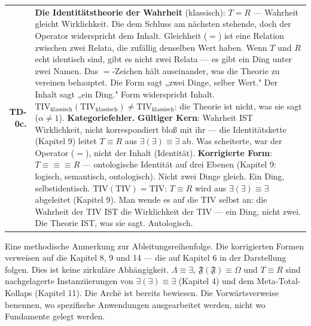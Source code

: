 \documentclass[10pt, openany, oneside]{book}
\renewcommand{\footnotesize}{\fontsize{8.5}{11}\selectfont}
\begin{document}
{\footnotesize
\noindent\begin{tabular}{r p{}}
\textbf{TD-0c.} & \textbf{Die Identitätstheorie der Wahrheit} (klassisch): $T = R$ --- Wahrheit gleicht Wirklichkeit. Die dem Schluss am nächsten stehende, doch der Operator widerspricht dem Inhalt. Gleichheit ($=$) ist eine Relation zwischen zwei Relata, die zufällig denselben Wert haben. Wenn $T$ und $R$ echt identisch sind, gibt es nicht zwei Relata --- es gibt ein Ding unter zwei Namen. Das $=$-Zeichen hält auseinander, was die Theorie zu vereinen behauptet. Die Form sagt „zwei Dinge, selber Wert." Der Inhalt sagt „ein Ding." Form widerspricht Inhalt. $\text{TIV}_{\text{klassisch}}(\text{TIV}_{\text{klassisch}}) \neq \text{TIV}_{\text{klassisch}}$: die Theorie ist nicht, was sie sagt ($\alpha \neq 1$). \textbf{Kategoriefehler.} \textbf{Gültiger Kern}: Wahrheit IST Wirklichkeit, nicht korrespondiert bloß mit ihr --- die Identitätskette (Kapitel 9) leitet $T \equiv R$ aus $\exists(\exists) \equiv \exists$ ab. Was scheiterte, war der Operator ($=$), nicht der Inhalt (Identität). \textbf{Korrigierte Form}: $T \equiv\!\equiv\!\equiv R$ --- ontologische Identität auf drei Ebenen (Kapitel 9: logisch, semantisch, ontologisch). Nicht zwei Dinge gleich. Ein Ding, selbstidentisch. $\text{TIV}(\text{TIV}) = \text{TIV}$: $T \equiv R$ wird aus $\exists(\exists) \equiv \exists$ abgeleitet (Kapitel 9). Man wende es auf die TIV selbst an: die Wahrheit der TIV IST die Wirklichkeit der TIV --- ein Ding, nicht zwei. Die Theorie IST, was sie sagt. Autologisch. \\[0.3em]
\end{tabular}
}

\vspace{0.8em}

\noindent Eine methodische Anmerkung zur Ableitungsreihenfolge. Die korrigierten Formen verweisen auf die Kapitel 8, 9 und 14 --- die auf Kapitel 6 in der Darstellung folgen. Dies ist keine zirkuläre Abhängigkeit. $\Lambda \equiv \exists$, $\mathfrak{F}(\mathfrak{F}) \equiv \Omega$ und $T \equiv R$ sind nachgelagerte Instanziierungen von $\exists(\exists) \equiv \exists$ (Kapitel 4) und dem Meta-Total-Kollaps (Kapitel 11). Die Arch\={e} ist bereits bewiesen. Die Vorwärtsverweise benennen, wo spezifische Anwendungen ausgearbeitet werden, nicht wo Fundamente gelegt werden.

\newpage
\end{document}
